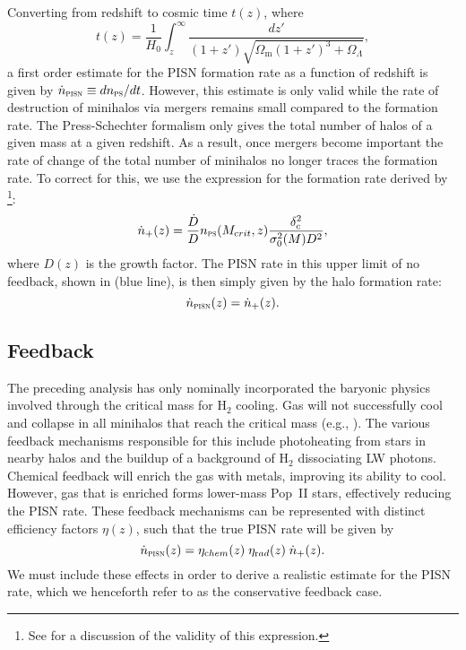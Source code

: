 \documentclass[../thesis.tex]{subfiles}
\begin{document}
Converting from redshift to cosmic time $t(z)$, where
\begin{equation} 
t(z) = \frac{1}{H_0}
\int_z^{\infty}\frac{dz'}{(1+z')\sqrt{\Omega_{\mathrm m} (1+z')^3 + \Omega_{\Lambda}}} ,
\end{equation} 
a first order estimate for the PISN formation rate as a function
of redshift is given by $\dot{n}_{\textsc{pisn}}\equiv
dn_{\textsc{ps}}/dt$. However, this estimate is only valid while the
rate of destruction of minihalos via mergers remains small compared to
the formation rate. The Press-Schechter formalism only gives the total
number of halos of a given mass at a given redshift. As a result, once
mergers become important the rate of change of the total number of
minihalos no longer traces the formation rate. To correct for this, we
use the expression for the formation rate derived by
\citet{Sasaki1994}\footnote{See \citet{Mitraetal2011}
  for a discussion of the validity of this expression.}:
\begin{equation}
\dot{n}_{+}(z) = \frac{\dot{D}}{D} n_{\textsc{ps}}(M_{\mathrm crit},z)
\frac{\delta_c^2}{\sigma^2_0(M) D^2},
\end{equation}
where $D(z)$ is the growth factor.  The PISN rate
in this upper limit of no feedback, shown in  (blue
line), is then simply given by the halo formation rate:
\begin{equation}
\dot{n}_{\textsc{pisn}}(z) = \dot{n}_{+}(z).
\end{equation}

\subsection{Feedback}
The preceding analysis has only nominally incorporated the baryonic
physics involved through the critical mass for H$_2$ cooling. Gas will
not successfully cool and collapse in all minihalos that reach the
critical mass (e.g., \citealt{Yoshidaetal2003}). The various feedback
mechanisms responsible for this include photoheating from stars in
nearby halos and the buildup of a background of H$_2$ dissociating LW
photons. Chemical feedback will enrich the gas with metals, improving
its ability to cool.  However, gas that is enriched forms lower-mass
Pop~II stars, effectively reducing the PISN rate. These
feedback mechanisms can be represented with distinct efficiency
factors $\eta(z)$, such that the true PISN rate will be given by
\begin{equation}
  \dot{n}_{\textsc{pisn}}(z) = 
  \eta_{\mathrm chem}(z) \; \eta_{\mathrm rad}(z) \; \dot{n}_{+}(z).
  \label{pisnrate1}
\end{equation}
We must include these effects in order to derive a realistic estimate
for the PISN rate, which we henceforth refer to as the conservative
feedback case.
\end{document}
